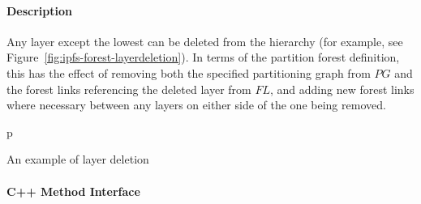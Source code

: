
\paragraph{Description}

Any layer except the lowest can be deleted from the hierarchy (for example, see Figure~\ref{fig:ipfs-forest-layerdeletion}). In terms of the partition forest definition, this has the effect of removing both the specified partitioning graph from $\textit{PG}$ and the forest links referencing the deleted layer from $\textit{FL}$, and adding new forest links where necessary between any layers on either side of the one being removed.

\begin{stusubfig}{p}
	\\
\caption{An example of layer deletion}
\label{fig:ipfs-forest-layerdeletion}
\end{stusubfig}

\paragraph{C++ Method Interface}

